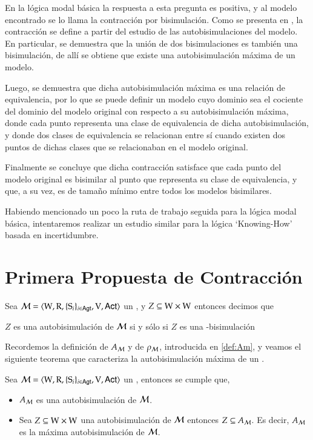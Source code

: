 En la lógica modal básica la respuesta a esta pregunta es positiva, y al modelo encontrado se lo llama la contracción por bisimulación.
Como se presenta en \cite[Capítulo 3]{HandbookModalLogic}, la contracción se define a partir del estudio de las autobisimulaciones del modelo. En particular,
se demuestra que la unión de dos bisimulaciones es también una bisimulación, de allí se obtiene que existe una autobisimulación máxima de un modelo.

Luego, se demuestra que dicha autobisimulación máxima es una relación de equivalencia, por lo que se puede definir un modelo cuyo dominio sea el cociente
del dominio del modelo original con respecto a su autobisimulación máxima, donde cada punto representa una clase de equivalencia de dicha autobisimulación, y donde 
dos clases de equivalencia se relacionan entre sí cuando existen dos puntos de dichas clases que se relacionaban en el modelo original.

Finalmente se concluye que dicha contracción satisface que cada punto del modelo original es bisimilar al punto que representa su clase de equivalencia, y 
que, a su vez, es de tamaño mínimo entre todos los modelos bisimilares.

Habiendo mencionado un poco la ruta de trabajo seguida para la lógica modal básica, intentaremos realizar un estudio similar para la lógica `Knowing-How' basada en 
incertidumbre.

\section{Primera Propuesta de Contracción}

\begin{definicion}
    Sea $\mathcal{M}=\langle \mathrm{W},\mathrm{R},\{ \mathrm{S}_i \}_{i \in {\rm \sf Agt}},\mathrm{V},{\rm \sf Act} \rangle$ un \ults, y $Z \subseteq \mathrm{W} \times \mathrm{W}$ entonces decimos que
    \begin{center}
        $Z$ es una autobisimulación de $\mathcal{M}$ si y sólo si $Z$ es una \KHilogic-bisimulación        
    \end{center}
\end{definicion}

Recordemos la definición de $A_{\mathcal{M}}$ y de $\rho_{\mathcal{M}}$, introducida en \ref{def:Am}, y veamos el siguiente teorema 
que caracteriza la autobisimulación máxima de un \ults.

\begin{teorema}
    Sea $\mathcal{M}=\langle \mathrm{W},\mathrm{R},\{ \mathrm{S}_i \}_{i \in {\rm \sf Agt}},\mathrm{V},{\rm \sf Act} \rangle$ un \ults, entonces se cumple que,
    \begin{itemize}
        \item $A_{\mathcal{M}}$ es una autobisimulación de $\mathcal{M}$.
        \item Sea $Z \subseteq \mathrm{W} \times \mathrm{W}$ una autobisimulación de $\mathcal{M}$ entonces $Z \subseteq A_{\mathcal{M}}$. 
        Es decir, $A_{\mathcal{M}} $ es la máxima autobisimulación de $\mathcal{M}$. 
    \end{itemize}
\end{teorema}

